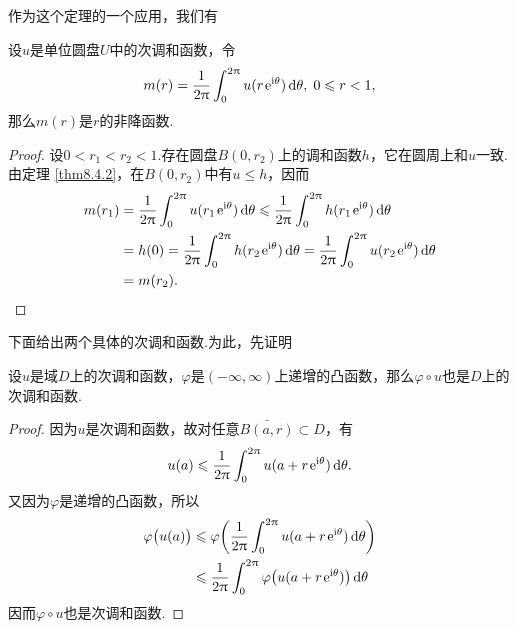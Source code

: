 作为这个定理的一个应用，我们有
\begin{theorem}\label{thm8.4.3}
  设$u$是单位圆盘$U$中的次调和函数，令
  \[
    m(r) = \frac1{2\uppi}\int_0^{2\uppi}u(r\operatorname{\!\!\;\mathrm e}^{\mathrm i\theta})\mathop{}\!\mathrm{d} \theta,\;0 \leqslant r < 1,
  \]
  那么$m(r)$是$r$的非降函数.
\end{theorem}
\begin{proof}
  设$0<r_1<r_2<1$.存在圆盘$B(0,r_2)$上的调和函数$h$，它在圆周上和$u$一致.由定理 \ref{thm8.4.2}，在$B(0,r_2)$中有$u\le h$，因而
  \begin{align*}
    m(r_1) & = \frac1{2\pi}\int_0^{2\pi}u(r_1\ee^{\ii\theta})\dif \theta
    \le \frac1{2\pi}\int_0^{2\pi} h(r_1\ee^{\ii\theta})
    \dif \theta\\
    &  = h(0) = \frac1{2\pi}\int_0^{2\pi}h(r_2\ee^{\ii\theta})
    \dif \theta
    = \frac1{2\pi}\int_0^{2\pi}u(r_2\ee^{\ii\theta})\dif \theta\\
    & = m(r_2). \qedhere
  \end{align*}
\end{proof}

下面给出两个具体的次调和函数.为此，先证明
\begin{prop}\label{prop8.4.4}
  设$u$是域$D$上的次调和函数，$\varphi$是$(-\infty,\infty)$上递增的凸函数，那么$\varphi\circ u$也是$D$上的次调和函数.
\end{prop}
\begin{proof}
  因为$u$是次调和函数，故对任意$\bar{B(a,r)}\subset D$，有
  \[
    u(a) \leqslant \frac1{2\uppi}\int_0^{2\uppi}u(a+r\operatorname{\!\!\;\mathrm e}^{\mathrm i\theta})\mathop{}\!\mathrm{d} \theta.
  \]
  又因为$\varphi$是递增的凸函数，所以
  \begin{align*}
    \varphi\big(u(a)\big)&\leqslant\varphi\bigg(\frac1{2\uppi}\int_0^{2\uppi}u(a+r\operatorname{\!\!\;\mathrm e}^{\mathrm i\theta})\mathop{}\!\mathrm{d} \theta\bigg)\\
    & \leqslant \frac1{2\uppi}\int_0^{2\uppi}\varphi\big(u(a+r\operatorname{\!\!\;\mathrm e}^{\mathrm i\theta})\big)\mathop{}\!\mathrm{d} \theta
  \end{align*}
  因而$\varphi\circ u$也是次调和函数.
\end{proof}

